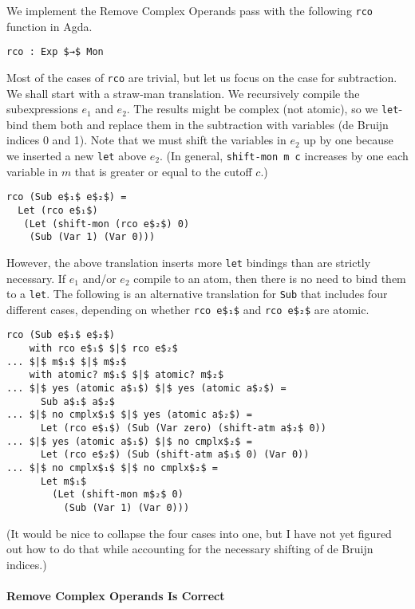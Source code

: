\documentclass[sigplan,screen]{acmart}
\begin{document}
We implement the Remove Complex Operands pass with the following
\lstinline{rco} function in Agda.
\begin{lstlisting}
rco : Exp $→$ Mon
\end{lstlisting}

Most of the cases of \lstinline{rco} are trivial, but let us focus on
the case for subtraction. We shall start with a straw-man
translation. We recursively compile the subexpressions $e_1$ and
$e_2$. The results might be complex (not atomic), so we
\lstinline{let}-bind them both and replace them in the subtraction
with variables (de Bruijn indices 0 and 1). Note that we must shift
the variables in $e_2$ up by one because we inserted a new
\lstinline{let} above $e_2$. (In general, \lstinline{shift-mon m c}
increases by one each variable in $m$ that is greater or equal to the
cutoff $c$.)

\begin{lstlisting}
rco (Sub e$₁$ e$₂$) =
  Let (rco e$₁$)
   (Let (shift-mon (rco e$₂$) 0)
    (Sub (Var 1) (Var 0)))
\end{lstlisting}

However, the above translation inserts more \lstinline{let} bindings
than are strictly necessary. If $e_1$ and/or $e_2$ compile to an atom,
then there is no need to bind them to a \lstinline{let}.  The
following is an alternative translation for \lstinline{Sub} that
includes four different cases, depending on whether \lstinline{rco e$₁$}
and \lstinline{rco e$₂$} are atomic.

\begin{lstlisting}
rco (Sub e$₁$ e$₂$)
    with rco e$₁$ $|$ rco e$₂$
... $|$ m$₁$ $|$ m$₂$
    with atomic? m$₁$ $|$ atomic? m$₂$
... $|$ yes (atomic a$₁$) $|$ yes (atomic a$₂$) =
      Sub a$₁$ a$₂$
... $|$ no cmplx$₁$ $|$ yes (atomic a$₂$) =
      Let (rco e$₁$) (Sub (Var zero) (shift-atm a$₂$ 0))
... $|$ yes (atomic a$₁$) $|$ no cmplx$₂$ =
      Let (rco e$₂$) (Sub (shift-atm a$₁$ 0) (Var 0))
... $|$ no cmplx$₁$ $|$ no cmplx$₂$ = 
      Let m$₁$
        (Let (shift-mon m$₂$ 0)
          (Sub (Var 1) (Var 0)))
\end{lstlisting}

(It would be nice to collapse the four cases into one, but I have not
yet figured out how to do that while accounting for the necessary
shifting of de Bruijn indices.)

\paragraph{Remove Complex Operands Is Correct}
\end{document}

